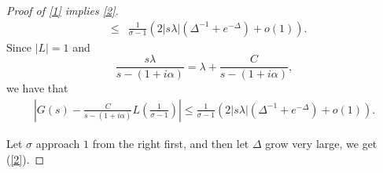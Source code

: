 \documentclass[11pt]{amsart}
\theoremstyle{definition}
\newcommand{\NN}{{\mathcal N}}
\begin{document}
\begin{proof}[Proof of \eqref{1} implies \eqref{2}]
\begin{eqnarray*}
 & \leq & \frac{1}{\sigma-1}(2\vert s\lambda\vert(\Delta^{-1}+e^{-\Delta})+o(1)).
  \end{eqnarray*}
Since $\vert L\vert=1$ and 
\[
 \frac{s\lambda}{s-(1+i\alpha)} = \lambda+\frac{C}{s-(1+i\alpha)},
 \]
 we have that 
  \begin{equation}\nonumber
    \begin{split}
   \left|G(s)-\frac{C}{s-(1+i\alpha)} L\left(\frac{1}{\sigma-1}\right) \right|
  \leq \frac{1}{\sigma-1}(2\vert s\lambda\vert(\Delta^{-1}+e^{-\Delta})+o(1)).
       \end{split}
 \end{equation}
 
 Let $\sigma$ approach $1$ from the right first, and then let $\Delta$ grow very large, we get (\ref{2}).
 \iffalse
 

\end{proof}
\end{document}
